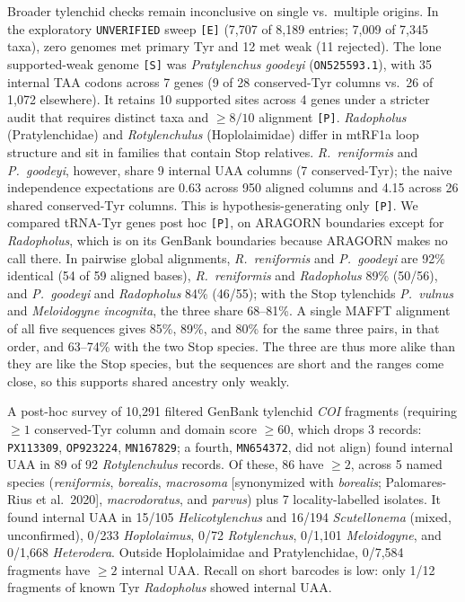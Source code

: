 \documentclass[11pt, a4paper]{article}
\begin{document}
Broader tylenchid checks remain inconclusive on single vs.\ multiple origins. In the exploratory \texttt{UNVERIFIED} sweep \texttt{[E]} (7,707 of 8,189 entries; 7,009 of 7,345 taxa), zero genomes met primary Tyr and 12 met weak (11 rejected). The lone supported-weak genome \texttt{[S]} was \textit{Pratylenchus goodeyi} (\texttt{ON525593.1}), with 35 internal TAA codons across 7 genes (9 of 28 conserved-Tyr columns vs.\ 26 of 1,072 elsewhere). It retains 10 supported sites across 4 genes under a stricter audit that requires distinct taxa and $\ge 8/10$ alignment \texttt{[P]}. \textit{Radopholus} (Pratylenchidae) and \textit{Rotylenchulus} (Hoplolaimidae) differ in mtRF1a loop structure and sit in families that contain Stop relatives. \textit{R.\ reniformis} and \textit{P.\ goodeyi}, however, share 9 internal UAA columns (7 conserved-Tyr); the naive independence expectations are 0.63 across 950 aligned columns and 4.15 across 26 shared conserved-Tyr columns. This is hypothesis-generating only \texttt{[P]}. We compared tRNA-Tyr genes post hoc \texttt{[P]}, on ARAGORN boundaries except for \textit{Radopholus}, which is on its GenBank boundaries because ARAGORN makes no call there. In pairwise global alignments, \textit{R.\ reniformis} and \textit{P.\ goodeyi} are 92\% identical (54 of 59 aligned bases), \textit{R.\ reniformis} and \textit{Radopholus} 89\% (50/56), and \textit{P.\ goodeyi} and \textit{Radopholus} 84\% (46/55); with the Stop tylenchids \textit{P.\ vulnus} and \textit{Meloidogyne incognita}, the three share 68--81\%. A single MAFFT alignment of all five sequences gives 85\%, 89\%, and 80\% for the same three pairs, in that order, and 63--74\% with the two Stop species. The three are thus more alike than they are like the Stop species, but the sequences are short and the ranges come close, so this supports shared ancestry only weakly.

A post-hoc survey of 10,291 filtered GenBank tylenchid \textit{COI} fragments (requiring $\ge 1$ conserved-Tyr column and domain score $\ge 60$, which drops 3 records: \texttt{PX113309}, \texttt{OP923224}, \texttt{MN167829}; a fourth, \texttt{MN654372}, did not align) found internal UAA in 89 of 92 \textit{Rotylenchulus} records. Of these, 86 have $\ge 2$, across 5 named species (\textit{reniformis}, \textit{borealis}, \textit{macrosoma} [synonymized with \textit{borealis}; Palomares-Rius et al.\ 2020], \textit{macrodoratus}, and \textit{parvus}) plus 7 locality-labelled isolates. It found internal UAA in 15/105 \textit{Helicotylenchus} and 16/194 \textit{Scutellonema} (mixed, unconfirmed), 0/233 \textit{Hoplolaimus}, 0/72 \textit{Rotylenchus}, 0/1,101 \textit{Meloidogyne}, and 0/1,668 \textit{Heterodera}. Outside Hoplolaimidae and Pratylenchidae, 0/7,584 fragments have $\ge 2$ internal UAA. Recall on short barcodes is low: only 1/12 fragments of known Tyr \textit{Radopholus} showed internal UAA.
\end{document}

